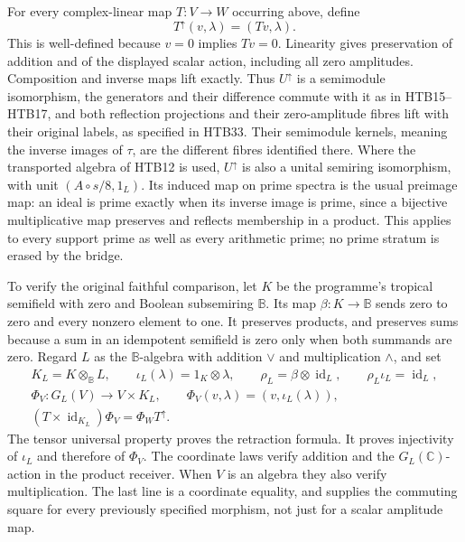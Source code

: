 \documentclass[11pt]{article}
\theoremstyle{definition}
\begin{document}
For every complex-linear map $T:V\to W$ occurring above, define
\begin{equation}\tag{HTB30}
 T^{\uparrow}(v,\lambda)=(Tv,\lambda).
\end{equation}
This is well-defined because $v=0$ implies $Tv=0$. Linearity gives
preservation of addition and of the displayed scalar action, including
all zero amplitudes. Composition and inverse maps lift exactly. Thus
$U^{\uparrow}$ is a semimodule isomorphism, the generators and their
difference commute with it as in HTB15--HTB17, and both reflection
projections and their zero-amplitude fibres lift with their original
labels, as specified in HTB33. Their semimodule kernels, meaning the
inverse images of $\tau$, are the different fibres identified there.
Where the transported algebra of HTB12 is used, $U^{\uparrow}$ is
also a unital semiring isomorphism, with unit
$(A\circ s/8,1_L)$. Its induced map on prime spectra is the usual
preimage map: an ideal is prime exactly when its inverse image is
prime, since a bijective multiplicative map preserves and reflects
membership in a product. This applies to every support prime as well
as every arithmetic prime; no prime stratum is erased by the bridge.

To verify the original faithful comparison, let $K$ be the programme's
tropical semifield with zero and Boolean subsemiring $\mathbb B$.
Its map $\beta:K\to\mathbb B$ sends zero to zero and every nonzero
element to one. It preserves products, and preserves sums because a
sum in an idempotent semifield is zero only when both summands are
zero. Regard $L$ as the $\mathbb B$-algebra with addition $\vee$ and
multiplication $\wedge$, and set
\begin{equation}\tag{HTB31}
\begin{gathered}
 K_L=K\otimes_{\mathbb B}L,\qquad
 \iota_L(\lambda)=1_K\otimes\lambda,\qquad
 \rho_L=\beta\otimes\operatorname{id}_L,\qquad
 \rho_L\iota_L=\operatorname{id}_L,\\
 \Phi_V:G_L(V)\longrightarrow V\times K_L,\qquad
 \Phi_V(v,\lambda)=(v,\iota_L(\lambda)),\\
 (T\times\operatorname{id}_{K_L})\Phi_V
       =\Phi_W T^{\uparrow}.
\end{gathered}
\end{equation}
The tensor universal property proves the retraction formula. It proves
injectivity of $\iota_L$ and therefore of $\Phi_V$. The coordinate
laws verify addition and the $G_L(\mathbb C)$-action in the product
receiver. When $V$ is an algebra they also verify multiplication.
The last line is a coordinate equality, and supplies the commuting
square for every previously specified morphism, not just for a
scalar amplitude map.
\end{document}
